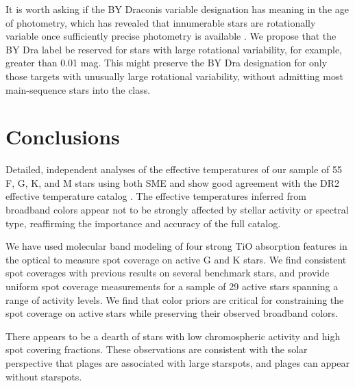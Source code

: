 It is worth asking if the BY Draconis variable designation has meaning in the age of \kepler photometry, which has revealed that innumerable stars are rotationally variable once sufficiently precise photometry is available \citep[e.g.:][]{Walkowicz2013,McQuillan2013,McQuillan2014,Giles2017}. We propose that the BY Dra label be reserved for stars with large rotational variability, for example, greater than 0.01 mag. This might preserve the BY Dra designation for only those targets with unusually large rotational variability, without admitting most main-sequence stars into the class.

\section{Conclusions} \label{sec:conclusion}

Detailed, independent analyses of the effective temperatures of our sample of 55 F, G, K, and M stars using both SME and \moog show good agreement with the \gaia DR2 effective temperature catalog \citep{DR2prop}. The \gaia effective temperatures inferred from broadband colors appear not to be strongly affected by stellar activity or spectral type, reaffirming the importance and accuracy of the full \citet{DR2prop} catalog.

We have used molecular band modeling of four strong TiO absorption features in the optical to measure spot coverage on active G and K stars. We find consistent spot coverages with previous results on several benchmark stars, and provide uniform spot coverage measurements for a sample of 29 active stars spanning a range of activity levels. We find that color priors are critical for constraining the spot coverage on active stars while preserving their observed broadband colors. 

There appears to be a dearth of stars with low chromospheric activity and high spot covering fractions. These observations are consistent with the solar perspective that plages are associated with large starspots, and plages can appear without starspots. %

